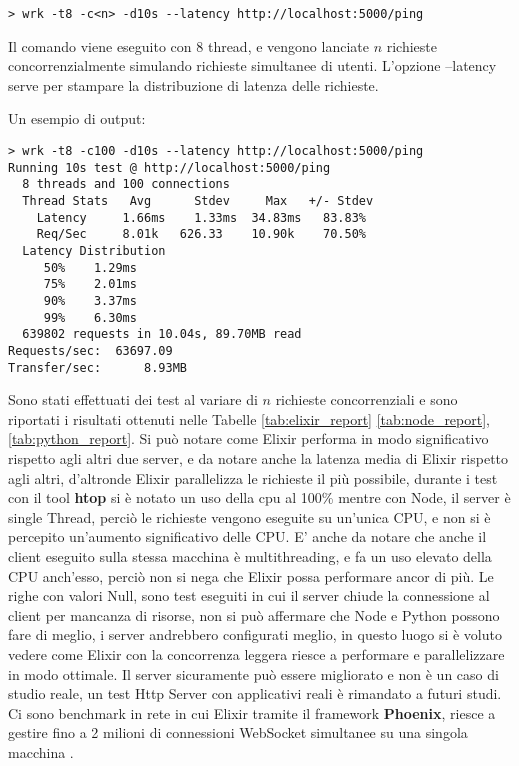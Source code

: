 \begin{lstlisting}[language=none]
> wrk -t8 -c<n> -d10s --latency http://localhost:5000/ping
\end{lstlisting}

Il comando viene eseguito con 8 thread, e vengono lanciate
$n$ richieste concorrenzialmente simulando richieste
simultanee di utenti. L'opzione --latency serve per stampare la
distribuzione di latenza delle richieste.

Un esempio di output:

\begin{lstlisting}[language=none]
> wrk -t8 -c100 -d10s --latency http://localhost:5000/ping
Running 10s test @ http://localhost:5000/ping
  8 threads and 100 connections
  Thread Stats   Avg      Stdev     Max   +/- Stdev
    Latency     1.66ms    1.33ms  34.83ms   83.83%
    Req/Sec     8.01k   626.33    10.90k    70.50%
  Latency Distribution
     50%    1.29ms
     75%    2.01ms
     90%    3.37ms
     99%    6.30ms
  639802 requests in 10.04s, 89.70MB read
Requests/sec:  63697.09
Transfer/sec:      8.93MB
\end{lstlisting}

Sono stati effettuati dei test al variare di $n$
richieste concorrenziali e sono riportati i risultati
ottenuti nelle Tabelle \ref{tab:elixir_report}
\ref{tab:node_report}, \ref{tab:python_report}.
Si può notare come Elixir performa in modo significativo
rispetto agli altri due server, e da notare anche la latenza media
di Elixir rispetto agli altri, d'altronde Elixir parallelizza
le richieste il più possibile, durante i test con il tool
\textbf{htop} si è notato un uso della cpu al 100\%
mentre con Node, il server è single Thread, perciò le richieste
vengono eseguite su un'unica CPU, e non si è percepito un'aumento
significativo delle CPU. E' anche da notare che anche il client
eseguito sulla stessa macchina è multithreading, e fa un uso
elevato della CPU anch'esso, perciò non si nega che Elixir
possa performare ancor di più.
Le righe con valori Null, sono test eseguiti in
cui il server chiude la connessione al client per mancanza
di risorse, non si può affermare che Node e Python possono
fare di meglio, i server andrebbero configurati meglio,
in questo luogo si è voluto vedere come Elixir con la
concorrenza leggera riesce a performare e parallelizzare
in modo ottimale. Il server sicuramente può essere migliorato
e non è un caso di studio reale, un test Http Server
con applicativi reali è rimandato a futuri studi.
Ci sono benchmark in rete in cui Elixir tramite il
framework \textbf{Phoenix},
riesce a gestire fino a 2 milioni di connessioni
WebSocket simultanee
su una singola macchina \cite{TheRoadt94:online}.

